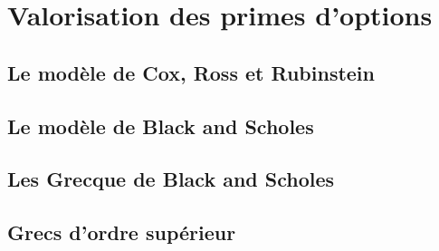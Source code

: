 \documentclass[a4paper, 12pt]{report}
\begin{document}
\section{Valorisation des primes d'options}

\subsection{Le modèle de Cox, Ross et Rubinstein}

\subsection{Le modèle de Black and Scholes}

\subsection{Les Grecque de Black and Scholes}

\subsection{Grecs d'ordre supérieur}
\end{document}
